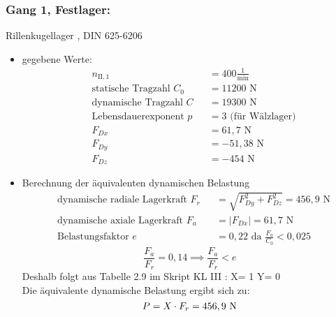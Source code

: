 \subsubsection{Gang 1, Festlager:} Rillenkugellager , DIN 625-6206\\
\begin{itemize}
	\item gegebene Werte:
	\begin{align*}
	&n_{{\mathord{\mathrm{II}},1}} &&=  400 \frac{1}{\text{min}} \\
	&\text{statische Tragzahl } C_{0} &&= 11200 \text{ N}\\
	&\text{dynamische Tragzahl } C &&= 19300 \text{ N} \\
	&\text{Lebensdauerexponent } p &&= 3 \text{ (für Wälzlager)} \\
	&F_{Dx} && = 61,7 \text{ N}\\
	&F_{Dy} && = -51,38 \text{ N}\\
	&F_{Dz} && = -454 \text{ N}
	\end{align*} 
	\item Berechnung der äquivalenten dynamischen Belastung
	\begin{align*}
	&\text{dynamische radiale Lagerkraft } F_r&& = \sqrt{F_{Dy}^2 + F_{Dz}^2 } = 456,9 \text{ N} \\
	&\text{dynamische axiale Lagerkraft } F_a&& = |F_{Dx}| = 61,7 \text{ N}\\
	&\text{Belastungsfaktor } e &&= 0,22 \text{ da } \frac{F_a}{C_0} < 0,025
	\end{align*} 
	\[\frac{F_a}{F_r} = 0,14 \implies \frac{F_a}{F_r} < e\]
	Deshalb folgt aus Tabelle 2.9 im Skript KL III : X= 1 \text{, } Y= 0 \\
	Die äquivalente dynamische Belastung ergibt sich zu: 
	\[
	P= X \cdot F_r = 456,9 \text{ N}
	\]
\end{itemize}

